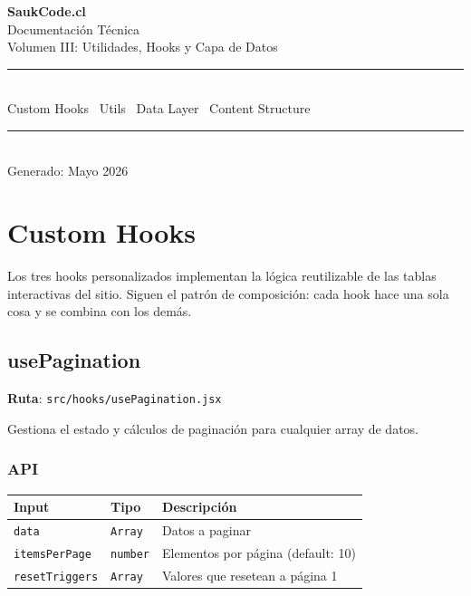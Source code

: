 \documentclass[12pt,a4paper]{article}
\begin{document}
\thispagestyle{empty}
\begin{center}
  \vspace*{3cm}
  {\Huge\bfseries\color{headerblue} SaukCode.cl}\\[0.5cm]
  {\Large\color{accent} Documentación Técnica}\\[0.3cm]
  {\large\color{codegray} Volumen III: Utilidades, Hooks y Capa de Datos}\\[2cm]
  \rule{10cm}{1.5pt}\\[0.5cm]
  {\normalsize Custom Hooks \textbullet\ Utils \textbullet\ Data Layer \textbullet\ Content Structure}\\[0.5cm]
  \rule{10cm}{1.5pt}\\[2cm]
  {\small\color{codegray} Generado: Mayo 2026}
\end{center}
\newpage

\tableofcontents
\newpage

\section{Custom Hooks}

Los tres hooks personalizados implementan la lógica reutilizable de las tablas interactivas del sitio. Siguen el patrón de composición: cada hook hace una sola cosa y se combina con los demás.

\subsection{usePagination}

\textbf{Ruta}: \texttt{src/hooks/usePagination.jsx}

Gestiona el estado y cálculos de paginación para cualquier array de datos.

\subsubsection{API}

\begin{table}[h]
\centering
\begin{tabular}{lll}
\toprule
\textbf{Input} & \textbf{Tipo} & \textbf{Descripción} \\
\midrule
\texttt{data} & \texttt{Array} & Datos a paginar \\
\texttt{itemsPerPage} & \texttt{number} & Elementos por página (default: 10) \\
\texttt{resetTriggers} & \texttt{Array} & Valores que resetean a página 1 \\
\bottomrule
\end{tabular}
\end{table}
\end{document}
